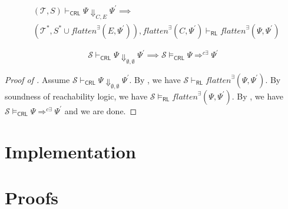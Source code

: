 \documentclass{article}
\newcommand{\RL}{\mathsf{RL}}
\newcommand{\CRL}{\mathsf{CRL}}
\begin{document}
\begin{lemma}\label{lem:CRLalmostSoundness}
    \begin{align*}
        & (\mathcal{T}, S) \vdash_\CRL \Psi \Downarrow_{C,E} \Psi^\prime \implies \\
        &
        (\mathcal{T}^*, S^* \cup \mathit{flatten}^\exists(E, \Psi^\prime)), \mathit{flatten}^\exists(C, \Psi^\prime) \vdash_\RL
          \mathit{flatten}^\exists(\Psi, \Psi^\prime) 
    \end{align*}
\end{lemma}

\begin{theorem}\label{thm:proofsystemSoundness}
\begin{equation*}
    \mathcal{S} \vdash_\CRL \Psi \Downarrow_{\emptyset,\emptyset} \Psi^\prime \implies
    \mathcal{S} \vDash_{\CRL} \Psi \Rightarrow^{c\exists} \Psi^\prime
\end{equation*}
\end{theorem}
\begin{proof}[Proof of ]
Assume $\mathcal{S} \vdash_\CRL \Psi \Downarrow_{\emptyset,\emptyset} \Psi^\prime$.
By , we have $\mathcal{S} \vdash_\RL \mathit{flatten}^\exists(\Psi, \Psi^\prime)$.
By soundness of reachability logic, we have $\mathcal{S} \vDash_\RL \mathit{flatten}^\exists(\Psi, \Psi^\prime)$.
By , 
we have $\mathcal{S} \vDash_{\CRL} \Psi \Rightarrow^{c\exists} \Psi^\prime$ and we are done.
\end{proof}

\section{Implementation}




\appendix

\section{Proofs}
\end{document}
